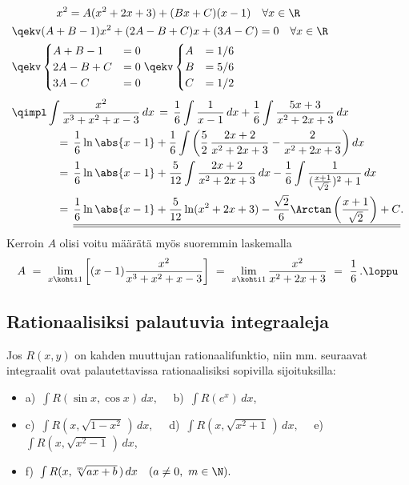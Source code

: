 \begin{align*}
&\qquad\qquad x^2= A(x^2+2x+3)+(Bx+C)(x-1)\quad\forall x\in\R \\
&\qekv       (A+B-1)x^2+(2A-B+C)x+(3A-C)=0\quad\forall x\in\R \\
&\qekv       \begin{cases} A+B-1 &= 0 \\ 2A-B+C &= 0 \\ 3A-C &= 0 \end{cases} 
             \qekv \begin{cases} A &= 1/6 \\ B &= 5/6 \\ C &= 1/2 \end{cases} \\[1mm]
&\qimpl\int\frac{x^2}{x^3+x^2+x-3}\,dx \,=\, 
                \frac{1}{6}\int\frac{1}{x-1}\, dx+\frac{1}{6}\int\frac{5x+3}{x^2+2x+3}\, dx \\
&\qquad\qquad=\,\frac{1}{6}\ln\abs{x-1}+\frac{1}{6}\int\left(
                \frac{5}{2}\,\frac{2x+2}{x^2+2x+3}-\frac{2}{x^2+2x+3}\right)dx \\
&\qquad\qquad=\,\frac{1}{6}\ln\abs{x-1}+\frac{5}{12}\int\frac{2x+2}{x^2+2x+3}\,dx
               -\frac{1}{6}\int\frac{1}{(\frac{x+1}{\sqrt{2}})^2+1}\,dx \\
&\qquad\qquad=\,\underline{\underline{\frac{1}{6}\ln\abs{x-1}+\frac{5}{12}\ln(x^2+2x+3)
                            -\frac{\sqrt{2}}{6}\Arctan\left(\frac{x+1}{\sqrt{2}}\right)+C}}.
\end{align*}
Kerroin $A$ olisi voitu määrätä myös suoremmin laskemalla
\[
A\ =\ \lim_{x\kohti 1}\left[(x-1)\frac{x^2}{x^3+x^2+x-3}\right]\ 
   =\ \lim_{x\kohti 1}\frac{x^2}{x^2+2x+3}\ =\ \frac{1}{6}\,. \loppu
\]

\subsection{Rationaalisiksi palautuvia integraaleja}

Jos $R(x,y)$ on kahden muuttujan rationaalifunktio, niin mm. seuraavat integraalit ovat
palautettavissa rationaalisiksi sopivilla sijoituksilla:
\begin{itemize}
\item[] a)\ $\int R(\sin x,\cos x)\,dx, \quad$ b)\ $\int R(e^x)\,dx$,
\item[] c)\ $\int R(x,\sqrt{1-x^2}\,)\,dx, \quad$ d)\ $\int R(x,\sqrt{x^2+1}\,)\,dx, \quad$
        e)\ $\int R(x,\sqrt{x^2-1}\,)\,dx$,
\item[] f)\ $\int R(x,\sqrt[m]{ax+b}\,)\,dx \quad (a\neq 0,\ m \in \N).$
\end{itemize}

